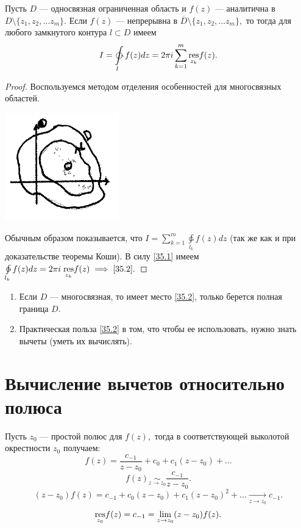 \documentclass[../../main.tex]{subfiles}
\begin{document}
	\begin{thm}
		Пусть $D$ --- односвязная ограниченная область и $f(z)$ --- аналитична в $D 
		\setminus\{z_1, z_2, \ldots z_m\}.$
		Если  $f(z)$ --- непрерывна в $\overline{D}\setminus\{z_1, z_2, \ldots 
		z_m\},$ 
		то тогда для любого замкнутого контура $l \subset D$ имеем
		\begin{equation} \label{35.2}
			I = \ointctrclockwise\limits_{l} f(z)dz = 2 \pi i 
			\sum_{k=1}^{m}\underset{z_k}{\res} f(z).
		\end{equation}
	\end{thm}	
	\begin{proof}
		Воспользуемся методом отделения особенностей для многосвязных областей.
		\begin{center}
	 	\includegraphics{lec35_1}
	 	\end{center}
		
		Обычным образом показывается, что $I = \sum\limits_{k=1}^{m} 
		\ointctrclockwise\limits_{l_k} f(z)dz$ 
		(так же как и при доказательстве теоремы Коши). 
		В силу \eqref{35.1} имеем $\ointctrclockwise\limits_{l_k} f(z)dz
		= 2 \pi i\; \underset{z_k}{\res} f(z) \implies 
		\eqref{35.2}.$
	\end{proof}	

	\begin{rems}
	
	\;
	
	\begin{enumerate}
		\item Если $D$ --- многосвязная, то имеет место \eqref{35.2}, только берется 
		полная граница $D.$
		\item Практическая польза \eqref{35.2} в том, что чтобы ее использовать, 
		нужно знать вычеты (уметь их вычислять).
	\end{enumerate}
	\end{rems}

	\section{Вычисление вычетов относительно полюса}
	Пусть $z_0$ --- простой полюс для $f(z),$ тогда в соответствующей выколотой 
	окрестности $z_0$ получаем:
	\[
		f(z) = \frac{c_{-1}}{z-z_0} + c_0 + c_1(z-z_0) + \ldots
	\]
	\[
		f(z) \underset{z \to z_0}{\sim} \frac{c_{-1}}{z - z_0}.
	\]
	\[
		(z-z_0)f(z) = c_{-1} + c_0(z-z_0) + c_1(z-z_0)^2 + \ldots \underset{z \to 
		z_0}{\to} c_{-1}. 
	\]
	\begin{equation} \label{35.3}
		\underset{z_0}{\operatorname{res}} f(z) = c_{-1} = \lim\limits_{z\to z_0}(z-z_0)f(z).
	\end{equation}
	
\end{document}
